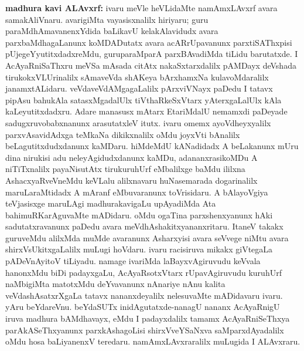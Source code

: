 {\large\textbf{madhura kavi ALAvxrf:}} ivaru meVle heVLidaMte namAmxLAvxrf avara samakAliVnaru. avarigiMta vayasisxnalilx hiriyaru; guru paraMdhAmavanenxYdida baLikavU kelakAlavidudx avara parxbaMdhagaLanunx koMDADutatx avara acARrUpavanunx parxtiSAThxpisi pUjegeYyutitxdadxreMdu, guruparaMparA parxBAvadiMda tiLidu barutatxde. I AcAyaRniSaThxru meVSa mAsada citAtx nakaSxtarxdalilx pAMDayx deVshada tirukokxVLUrinalilx sAmaveVda shAKeya bArxhamxNa kulavoMdaralilx janamxtALidaru. veVdaveVdAMgagaLalilx pArxviVNayx paDedu I tatavx pipAsu bahukAla satasxMgadalUlx tiVthaRkeSxVtarx yAterxgaLalUlx kAla kaLeyutitxdadxru. Adare manasusx mAtarx EtariMdalU nemamxdi paDeyade sadugxruvobabxnanunx arasutatxleV itutx. ivaru omemx ayoVdheyxyalilx parxvAsavidAdxga teMkaNa dikikxnalilx oMdu joyxVti bAnalilx beLagutitxdudxdanunx kaMDaru. hiMdeMdU kANadidadx A beLakanunx mUru dina nirukisi adu neleyAgidudxdanunx kaMDu, adananxrasikoMDu A niTiTxnalilx payaNisutAtx tirukuruhUrf eMbalilxge baMdu ililxna AshacxyaRveVneMdu keVLalu alilxnavaru huNasemarada dogarinalilx maruLaraMtidadx A mAranf eMbuvaranunx toVrisidaru. A bAlayoVgiya teVjasisxge maruLAgi madhurakavigaLu upAyadiMda Ata bahimuRKarAguvaMte mADidaru. oMdu ogaTina parxshenxyanunx hAki sadutatxravanunx paDedu avara meVdhAshakitxyananxritaru. ItaneV takakx guruveMdu alilxMda muMde avaranunx Asharxyisi avara seVvege niMtu avara shirxVsUkitxgaLalilx muLugi hoVdaru. ivaru racisiruva mikakx giVtegaLa pADeVnAyitoV tiLiyadu. namage ivariMda laBayxvAgiruvudu keVvala hanonxMdu biDi padayxgaLu, AcAyaRsotxVtarx rUpavAgiruvudu kuruhUrf naMbigiMta matotxMdu deYvavanunx nAnariye nAnu kalita veVdashAsatxrXgaLa tatavx nananxdeyalilx nelesuvaMte mADidavaru ivaru. yAru beYdareVnu. beYdaSUTx inidAgutatxde-nanagU nananx AcAyaRnigU iruva madhura bAMdhavayx, eMdu I padayxdalilx tamamx AcAyaRniSeThxya parAkASeThxyanunx parxkAshagoLisi shirxVveYSaNxva saMparxdAyadalilx oMdu hosa baLiyanenxV teredaru. namAmxLAvxraralilx muLugida I ALAvxraru.

